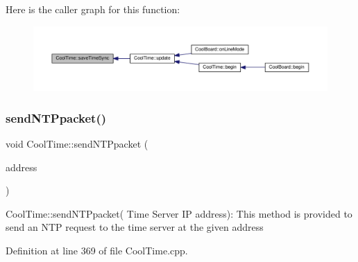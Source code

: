 Here is the caller graph for this function\+:\nopagebreak
\begin{figure}[H]
\begin{center}
\leavevmode
\includegraphics[width=350pt]{d6/d49/class_cool_time_ae9658c9b377510d469e3b88edf33ee85_icgraph}
\end{center}
\end{figure}
\mbox{\label{class_cool_time_a236a38d120dc53bc67456d763838c5a1}} 
\subsubsection{\texorpdfstring{send\+N\+T\+Ppacket()}{sendNTPpacket()}}
{\footnotesize\ttfamily void Cool\+Time\+::send\+N\+T\+Ppacket (\begin{DoxyParamCaption}\item[{I\+P\+Address \&}]{address }\end{DoxyParamCaption})}

Cool\+Time\+::send\+N\+T\+Ppacket( Time Server I\+P address)\+: This method is provided to send an N\+TP request to the time server at the given address 

Definition at line 369 of file Cool\+Time.\+cpp.


